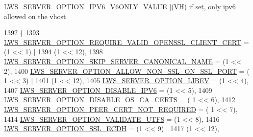 \begin{Desc}
\begin{description}
{L\+W\+S\+\_\+\+S\+E\+R\+V\+E\+R\+\_\+\+O\+P\+T\+I\+O\+N\+\_\+\+I\+P\+V6\+\_\+\+V6\+O\+N\+L\+Y\+\_\+\+V\+A\+L\+UE\hypertarget{group__context-and-vhost_gga41c2d763f78cc248df3b9f8645dbd2a5aca5d42820b65eac5618ec3f0bd8a1160}{}\label{group__context-and-vhost_gga41c2d763f78cc248df3b9f8645dbd2a5aca5d42820b65eac5618ec3f0bd8a1160}
}](VH) if set, only ipv6 allowed on the vhost \end{description}
\end{Desc}

\begin{DoxyCode}
1392                          \{
1393         \hyperlink{group__context-and-vhost_gga41c2d763f78cc248df3b9f8645dbd2a5a274ed462a1a9239eb6ddf9007f5b7092}{LWS\_SERVER\_OPTION\_REQUIRE\_VALID\_OPENSSL\_CLIENT\_CERT}  
      = (1 << 1) |
1394                                                                   (1 << 12),
1398         \hyperlink{group__context-and-vhost_gga41c2d763f78cc248df3b9f8645dbd2a5a6582c985ee0ceaadc1d277030eae2d7c}{LWS\_SERVER\_OPTION\_SKIP\_SERVER\_CANONICAL\_NAME}                
      = (1 << 2),
1400         \hyperlink{group__context-and-vhost_gga41c2d763f78cc248df3b9f8645dbd2a5a1cc4562d05cba52a6dfa0697a65ade0d}{LWS\_SERVER\_OPTION\_ALLOW\_NON\_SSL\_ON\_SSL\_PORT}          = (
      1 << 3) |
1401                                                                   (1 << 12),
1405         \hyperlink{group__context-and-vhost_gga41c2d763f78cc248df3b9f8645dbd2a5a273d9975675130de0c6dc937dde7c8a6}{LWS\_SERVER\_OPTION\_LIBEV}                                  = (1 << 4),
1407         \hyperlink{group__context-and-vhost_gga41c2d763f78cc248df3b9f8645dbd2a5a34ab36e68c0d593b6f19b8d5ef1240a9}{LWS\_SERVER\_OPTION\_DISABLE\_IPV6}                            = (1 << 5),
1409         \hyperlink{group__context-and-vhost_gga41c2d763f78cc248df3b9f8645dbd2a5a4933347a821e73c3f1e13fb6bfc7ad93}{LWS\_SERVER\_OPTION\_DISABLE\_OS\_CA\_CERTS}                      = (
      1 << 6),
1412         \hyperlink{group__context-and-vhost_gga41c2d763f78cc248df3b9f8645dbd2a5ac56a8a6590e74a8016d0fae09fb404fc}{LWS\_SERVER\_OPTION\_PEER\_CERT\_NOT\_REQUIRED}                = (
      1 << 7),
1414         \hyperlink{group__context-and-vhost_gga41c2d763f78cc248df3b9f8645dbd2a5aa0158b4e85420811e6b0f1378c6ded0f}{LWS\_SERVER\_OPTION\_VALIDATE\_UTF8}                          = (1 << 8),
1416         \hyperlink{group__context-and-vhost_gga41c2d763f78cc248df3b9f8645dbd2a5a1b2f8bde0f62adc7ebe81b2043f34c0c}{LWS\_SERVER\_OPTION\_SSL\_ECDH}                            = (1 << 9) |
1417                                                                   (1 << 12),

\end{DoxyCode}
